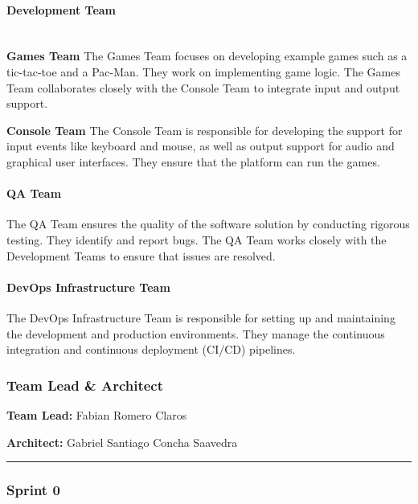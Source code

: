 \hypertarget{devteamrole}{
\paragraph{Development Team}\label{devteamrole}}

\textbf{\\Games Team}
The Games Team focuses on developing example games such as a tic-tac-toe and a Pac-Man. They work on implementing game logic. The Games Team collaborates closely with the Console Team to integrate input and output support.

\textbf{Console Team}
The Console Team is responsible for developing the support for input events like keyboard and mouse, as well as output support for audio and graphical user interfaces. They ensure that the platform can run the games.

\hypertarget{qateamrole}{
\paragraph{QA Team}\label{qateamrole}}
The QA Team ensures the quality of the software solution by conducting rigorous testing. They identify and report bugs. The QA Team works closely with the Development Teams to ensure that issues are resolved.

\hypertarget{devops}{
\paragraph{DevOps Infrastructure Team}\label{devops}}
The DevOps Infrastructure Team is responsible for setting up and maintaining the development and production environments. They manage the continuous integration and continuous deployment (CI/CD) pipelines.


\hypertarget{teamleadarchitect}{
\subsubsection{Team Lead \& Architect}\label{teamleadarchitect}}

\textbf{Team Lead:}
Fabian Romero Claros

\textbf{Architect:}
Gabriel Santiago Concha Saavedra

\begin{center}\rule{0.5\linewidth}{0.5pt}\end{center}

\hypertarget{sprint0}{
\subsubsection{Sprint 0}\label{sprint0}}

